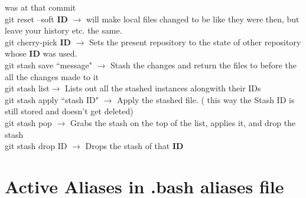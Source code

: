 \documentclass[twoside,a4paper]{article}
\newcommand{\tcb}{\color{blue}}
\newcommand{\tcc}{\color{cyan}}
\newcommand{\tcr}{\color{red}}
\newcommand{\tcg}{\color{gray}}
\newcommand{\tck}{\color{black}}
\newcommand{\ra }{$\rightarrow$ }
\begin{document}
\begin{multicols}{2}
	was at that commit\\
	\tcr git reset \tcb --soft \textbf{ID} \tck 
	\ra will make local files changed to be like they were then,
	but leave your history etc. the same.\\
	\tcr git \tcb cherry-pick \textbf{ID} \tck 
	\ra Sets the present repository to the state of other 
	repository whose \textbf{ID} was used.\\
	\tcr git stash \tcb save ``message"\tck 
	\ra Stash the changes and return the files to before the all 
	the changes made to it\\
	\tcr git stash \tcb list\tck $\rightarrow$
	Lists out all the stashed instances alongwith their IDs\\
	\tcr git stash apply \tcb ``stash ID" \tck 
	\ra Apply the stashed file. \tcg  ( this way the 
	Stash ID is still stored and doesn't get deleted)\\
	\tcr git stash \tcb pop \tck \ra Grabs
	the stash on the top of the list, applies it, and drop the stash\\
	\tcr git stash \tcb drop ID \tck \ra 
	Drops the stash of that \textbf{ID}\\

\vfill \null


\tcc \section{Active Aliases in 
.bash \textunderscore aliases file}


\end{multicols}
\end{document}
